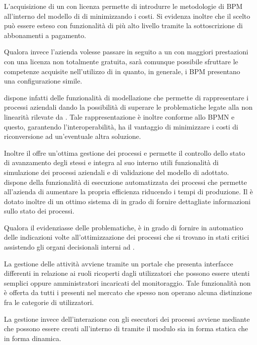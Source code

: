 L'acquisizione di un \sw con licenza  permette di introdurre le metodologie di BPM all'interno del modello di \bsn di \customer minimizzando i costi. Si evidenza inoltre che il \sw scelto può essere esteso con funzionalità di più alto livello tramite la sottoscrizione di abbonamenti a pagamento.

Qualora invece l'azienda volesse passare in seguito a un \sw con maggiori prestazioni con una licenza non totalmente gratuita, sarà comunque possibile sfruttare le competenze acquisite nell'utilizzo di \progname in quanto, in generale, i \sw BPM presentano una configurazione simile. 

\progname dispone infatti delle funzionalità di modellazione che permette di rappresentare i processi aziendali dando la possibilità  di superare le problematiche legate alla non linearità rilevate da \team. Tale rappresentazione è inoltre conforme allo  BPMN e questo, garantendo l'interoperabilità, ha il vantaggio di minimizzare i costi di riconversione ad un'eventuale altra soluzione.

Inoltre il \sw offre un'ottima gestione dei processi e permette il controllo dello stato di avanzamento degli stessi e integra al suo interno utili funzionalità di simulazione dei processi aziendali e di validazione del modello di \bsn adottato. \progname dispone della funzionalità di esecuzione automatizzata dei processi che permette all'azienda di aumentare la propria efficienza riducendo i tempi di produzione. Il \sw è dotato inoltre di un ottimo sistema di  in grado di fornire dettagliate informazioni sullo stato dei processi.

Qualora il  evidenziasse delle problematiche, \progname è in grado di fornire in automatico delle indicazioni volte all'ottimizzazione dei processi che si trovano in stati critici assistendo gli organi decisionali interni ad \customer.

La gestione delle attività avviene tramite un portale che presenta interfacce differenti in relazione ai ruoli ricoperti dagli utilizzatori che possono essere utenti semplici oppure amministratori incaricati del monitoraggio. Tale funzionalità non è offerta da tutti i \sw presenti nel mercato che spesso non operano alcuna distinzione fra le categorie di utilizzatori.

La gestione invece dell'interazione con gli esecutori dei processi avviene mediante  che possono essere creati all'interno di \progname tramite il modulo  sia in forma statica che in forma dinamica.


